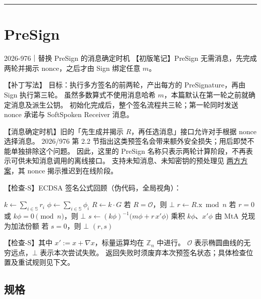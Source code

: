 \begin{center}\rule{0.5\linewidth}{0.5pt}\end{center}

\section{PreSign}

\begin{patchnote}{2026-976｜替换 PreSign 的消息确定时机}
【初版笔记】PreSign 无需消息，先完成两轮并揭示 nonce，之后才由 Sign 绑定任意 $m$。

【补丁写法】
目标：执行多方签名的前两轮，产出每方的 PreSignature，再由 Sign 执行第三轮。
虽然多数算式不使用消息哈希 $m$，本篇默认在第一轮之前就确定消息及派生公钥。
初始化完成后，整个签名流程共三轮；第一轮同时发送 nonce 承诺与 SoftSpoken Receiver 消息。

【消息确定时机】旧的「先生成并揭示 $R$，再任选消息」接口允许对手根据 nonce 选择消息。
2026/976 第 2.2 节指出这类预签名会带来额外安全损失；用后即焚不能单独排除这个问题。
因此，这里的 PreSign 名称只表示两轮计算阶段，不再表示可供未知消息调用的离线接口。
支持未知消息、未知密钥的预处理见 \hyperref[sec:orch:two-party-2026]{两方方案}，其 nonce 揭示推迟到在线阶段。
\end{patchnote}

【检查-S】ECDSA 签名公式回顾（伪代码，全局视角）：

\begin{codebox}
\li $k \gets \sum_{i \in\mathbb{S}} r_i$
\li $\phi \gets \sum_{i \in\mathbb{S}} \phi_i$
\li $R \gets k \cdot G$
\li 若 $R=\mathcal O$，则 \Return $\bot$
\li $r \gets R.\mathrm{x} \bmod n$
\li 若 $r=0$ 或 $k\phi=0 \pmod n$，则 \Return $\bot$
\li $s \gets (k\phi)^{-1}\bigl(m\phi + r\,x'\phi\bigr)$
\Comment 乘积 $k\phi$、$x'\phi$ 由 MtA 兑现为加法份额
\li 若 $s=0$，则 \Return $\bot$
\li \Return $(r, s)$
\end{codebox}

【检查-S】其中 $x' := x + \nabla x$，标量运算均在 $\mathbb Z_n$ 中进行。
$\mathcal O$ 表示椭圆曲线的无穷远点，$\bot$ 表示本次尝试失败。
返回失败时须废弃本次预签名状态；具体检查位置及重试规则见下文。

\subsection{规格}

